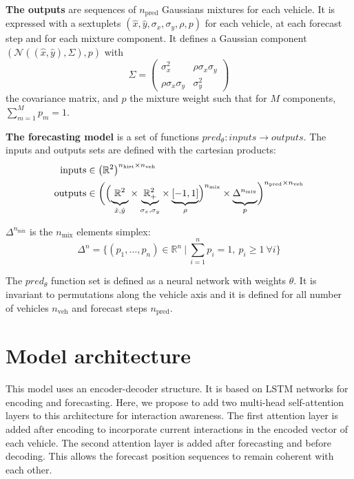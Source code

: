 \documentclass[a4paper, 10pt, conference]{ieeeconf}      %
\begin{document}
\textbf{The outputs} are sequences of $n_{\text{pred}}$ Gaussians mixtures for each vehicle.
It is expressed with a sextuplets $(\hat{x}, \hat{y}, \sigma_x, \sigma_y, \rho, p)$
for each vehicle, at each forecast step and for each mixture component.
It defines a Gaussian component $(\mathcal{N}((\hat{x}, \hat{y}), \Sigma), p)$ with
    \[\Sigma =
    \left( \begin{matrix}
        \sigma_x^2 & \rho \sigma_x \sigma_y \\
        \rho \sigma_x \sigma_y & \sigma_y^2
    \end{matrix}\right)
    \]
the covariance matrix, and $p$ the mixture weight such that for $M$ components, $\sum_{m=1}^M{p_m} = 1$.

\textbf{The forecasting model} is a set of functions $pred_\theta : inputs \rightarrow outputs$.
The inputs and outputs sets are defined with the cartesian products:
\begin{equation*}
    \begin{split}
    \text{inputs} &\in \left( \mathbb{R}^{2} \right)^{n_{\text{hist}} \times n_{\text{veh}}}\\
    \text{outputs} &\in \bigg(\Big( {
    \underbrace{\vphantom{\mathbb{R}_+^{2}}
        \mathbb{R}^{2}}_{\hat{x}, \hat{y}}} \times
    {\underbrace{
        \mathbb{R}_+^{2}}_{\sigma_x, \sigma_y}} \times
    {\underbrace{\vphantom{\mathbb{R}_+^{2}}
        [-1, 1]}_{\rho}}\Big)^{n_{\text{mix}}} \times
    {\underbrace{\vphantom{\mathbb{R}_+^{2}}
    \Delta^{n_{\text{mix}}}}_{p}} \bigg)^{n_{\text{pred}} \times n_{\text{veh}}}
    \end{split}
\end{equation*}

$\Delta^{n_{\text{mix}}}$ is the $n_{\text{mix}}$ elements simplex:
\[\Delta^{n} = \Big\{(p_1,\dots,p_n)\in\mathbb{R}^{n}~\Big|~\sum_{i = 1}^n p_i = 1,~ p_i \ge 1~ \forall i\Big\}\]

The $pred_\theta$ function set is defined as a neural network with weights $\theta$.
It is invariant to permutations along the vehicle axis and it
is defined for all number of vehicles $n_{\text{veh}}$ and forecast steps $n_{\text{pred}}$.


\section{Model architecture}

This model uses an encoder-decoder structure.
It is based on LSTM networks for encoding and forecasting.
Here, we propose to add two multi-head self-attention layers to this architecture for interaction awareness.
The first attention layer is added after encoding to incorporate current interactions in the encoded vector of each vehicle.
The second attention layer is added after forecasting and before decoding.
This allows the forecast position sequences to remain coherent with each other.
\end{document}
